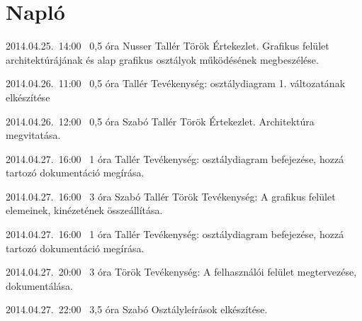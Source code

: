 %
\section{Napló}

\begin{naplo}

\bejegyzes
{2014.04.25.~14:00~}
{0,5 óra}
{Nusser\newline
Tallér\newline
Török}
{Értekezlet. Grafikus felület architektúrájának és alap grafikus osztályok működésének megbeszélése.}

\bejegyzes
{2014.04.26.~11:00~}
{0,5 óra}
{Tallér}
{Tevékenység: osztálydiagram 1. változatának elkészítése}

\bejegyzes
{2014.04.26.~12:00~}
{0,5 óra}
{Szabó\newline
Tallér\newline
Török}
{Értekezlet. Architektúra megvitatása.}

\bejegyzes
{2014.04.27.~16:00~}
{1 óra}
{Tallér}
{Tevékenység: osztálydiagram befejezése, hozzá tartozó dokumentáció megírása.}

\bejegyzes
{2014.04.27.~16:00~}
{3 óra}
{Szabó\newline
Tallér\newline
Török\newline}
{Tevékenység: A grafikus felület elemeinek, kinézetének összeállítása.}

\bejegyzes
{2014.04.27.~16:00~}
{1 óra}
{Tallér}
{Tevékenység: osztálydiagram befejezése, hozzá tartozó dokumentáció megírása.}

\bejegyzes
{2014.04.27.~20:00~}
{3 óra}
{Török}
{Tevékenység: A felhasználói felület megtervezése, dokumentálása.}

\bejegyzes
{2014.04.27.~22:00~} %
{3,5 óra} %
{Szabó} %
{Osztályleírások elkészítése.} %

\end{naplo}
